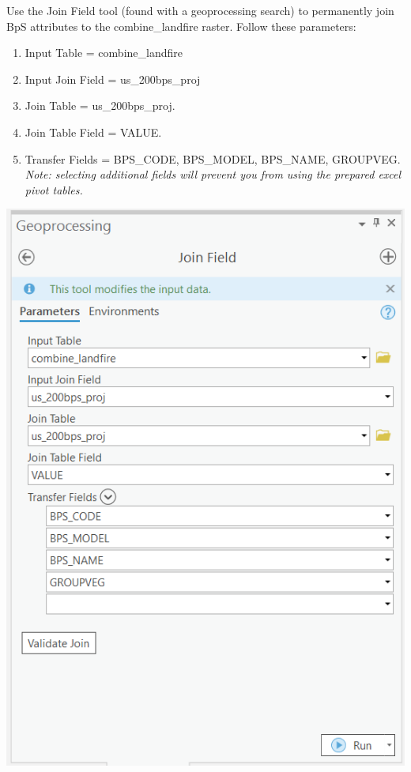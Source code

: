 \documentclass[
]{book}
\providecommand{\tightlist}{%
  \setlength{\itemsep}{0pt}\setlength{\parskip}{0pt}}
\begin{document}
Use the Join Field tool (found with a geoprocessing search) to permanently join BpS attributes to the combine\_landfire raster. Follow these parameters:

\begin{enumerate}
\def\labelenumi{\arabic{enumi}.}
\tightlist
\item
  Input Table = combine\_landfire
\item
  Input Join Field = us\_200bps\_proj
\item
  Join Table = us\_200bps\_proj.
\item
  Join Table Field = VALUE.
\item
  Transfer Fields = BPS\_CODE, BPS\_MODEL, BPS\_NAME, GROUPVEG. \emph{Note: selecting additional fields will prevent you from using the prepared excel pivot tables.}
\end{enumerate}

\includegraphics[width=1000px]{04_gis_screenshots/8_join_bps}
\end{document}
